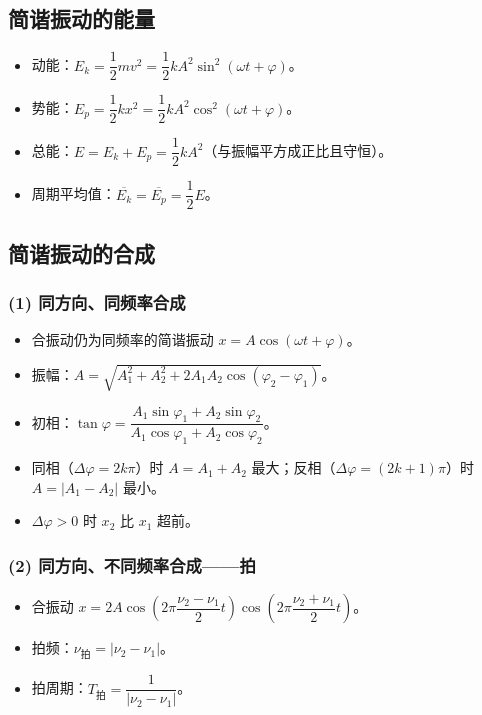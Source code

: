 \documentclass[12pt,a4paper]{ctexart}
\begin{document}
\subsection{简谐振动的能量}

\begin{itemize}
    \item 动能：$E_k=\dfrac{1}{2}mv^2=\dfrac{1}{2}kA^2\sin^2(\omega t+\varphi)$。
    \item 势能：$E_p=\dfrac{1}{2}kx^2=\dfrac{1}{2}kA^2\cos^2(\omega t+\varphi)$。
    \item 总能：$E=E_k+E_p=\dfrac{1}{2}kA^2$（与振幅平方成正比且守恒）。
    \item 周期平均值：$\overline{E_k}=\overline{E_p}=\dfrac{1}{2}E$。
\end{itemize}

\subsection{简谐振动的合成}

\subsubsection*{(1) 同方向、同频率合成}

\begin{itemize}
    \item 合振动仍为同频率的简谐振动 $x=A\cos(\omega t+\varphi)$。
    \item 振幅：$A=\sqrt{A_1^2+A_2^2+2A_1A_2\cos(\varphi_2-\varphi_1)}$。
    \item 初相：$\tan\varphi=\dfrac{A_1\sin\varphi_1+A_2\sin\varphi_2}{A_1\cos\varphi_1+A_2\cos\varphi_2}$。
    \item 同相（$\Delta\varphi=2k\pi$）时 $A=A_1+A_2$ 最大；反相（$\Delta\varphi=(2k+1)\pi$）时 $A=|A_1-A_2|$ 最小。
    \item $\Delta\varphi>0$ 时 $x_2$ 比 $x_1$ 超前。
\end{itemize}

\subsubsection*{(2) 同方向、不同频率合成——拍}

\begin{itemize}
    \item 合振动 $x=2A\cos\!\left(2\pi\dfrac{\nu_2-\nu_1}{2}t\right)\cos\!\left(2\pi\dfrac{\nu_2+\nu_1}{2}t\right)$。
    \item 拍频：$\nu_{\text{拍}}=|\nu_2-\nu_1|$。
    \item 拍周期：$T_{\text{拍}}=\dfrac{1}{|\nu_2-\nu_1|}$。
\end{itemize}
\end{document}
